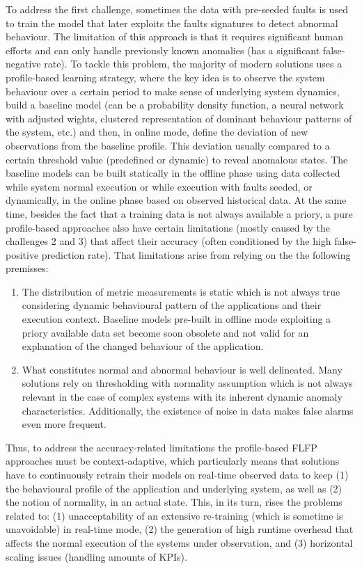 \documentclass[]{usiinfprospectus}
\begin{document}
To address the first challenge, sometimes the data with pre-seeded faults is used to train the model that later exploits the faults signatures to detect abnormal behaviour. The limitation of this approach is that it requires significant human efforts and can only handle previously known anomalies (has a significant false-negative rate). To tackle this problem, the majority of modern solutions uses a profile-based learning strategy, where the key idea is to observe the system behaviour over a certain period to make sense of underlying system dynamics, build a baseline model (can be a probability density function, a neural network with adjusted wights, clustered representation of dominant behaviour patterns of the system, etc.) and then, in online mode, define the deviation of new observations from the baseline profile. This deviation usually compared to a certain threshold value (predefined or dynamic) to reveal anomalous states. The baseline models can be built statically in the offline phase using data collected while system normal execution or while execution with faults seeded, or dynamically, in the online phase based on observed historical data. At the same time, besides the fact that a training data is not always available a priory, a pure profile-based approaches also have certain limitations (mostly caused by the challenges 2 and 3) that affect their accuracy (often conditioned by the high false-positive prediction rate). That limitations arise from relying on the the following premisses:\begin{enumerate}
	\item The distribution of metric measurements is static which is not always true considering dynamic behavioural pattern of the applications and their execution context. Baseline models pre-built in offline mode exploiting a priory available data set become soon obsolete and not valid for an explanation of the changed behaviour of the application.
	\item What constitutes normal and abnormal behaviour is well delineated. Many solutions rely on thresholding with normality assumption which is not always relevant in the case of complex systems with its inherent dynamic anomaly characteristics. Additionally, the existence of noise in data makes false alarms even more frequent.
\end{enumerate}
%
Thus, to address the accuracy-related limitations the profile-based FLFP approaches must be context-adaptive, which particularly means that  solutions have to continuously retrain their models on real-time observed data to keep (1) the behavioural profile of the application and underlying system, as well as (2) the notion of normality, in an actual state. This, in its turn, rises the problems related to: (1) unacceptability of an extensive re-training (which is sometime is unavoidable) in real-time mode, (2) the generation of high runtime overhead that affects the normal execution of the systems under observation, and (3) horizontal scaling issues (handling amounts of KPIs).
%
\end{document}
